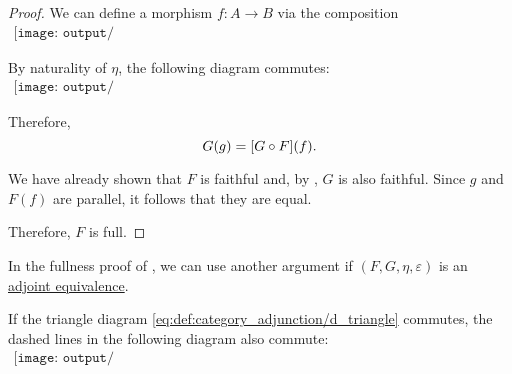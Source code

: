 \begin{proof}
  We can define a morphism \( f: A \to B \) via the composition
  \begin{equation}\label{eq:thm:equivalence_induces_fully_faithful_and_essentially_surjective_functor/fullness/def}
    \begin{aligned}
      \texttt{[image: output/thm\_\_equivalence\_induces\_fully\_faithful\_and\_essentially\_surjective\_functor.pdf]}
    \end{aligned}
  \end{equation}

  By naturality of \( \eta \), the following diagram commutes:
  \begin{equation}\label{eq:thm:equivalence_induces_fully_faithful_and_essentially_surjective_functor/fullness/eta_nat}
    \begin{aligned}
      \texttt{[image: output/thm\_\_equivalence\_induces\_fully\_faithful\_and\_essentially\_surjective\_functor.pdf]}
    \end{aligned}
  \end{equation}

  Therefore,
  \begin{equation*}
     G(g) = [G \bincirc F](f).
  \end{equation*}

  We have already shown that \( F \) is faithful and, by , \( G \) is also faithful. Since \( g \) and \( F(f) \) are parallel, it follows that they are equal.

  Therefore, \( F \) is full.
\end{proof}

\begin{remark}\label{rem:adjoint_equivalence_induces_fully_faithful_and_essentially_surjective_functor}
  In the fullness proof of , we can use another argument if \( (F, G, \eta, \varepsilon) \) is an \hyperref[def:adjoint_equivalence]{adjoint equivalence}.

  If the triangle diagram \eqref{eq:def:category_adjunction/d_triangle} commutes, the dashed lines in the following diagram also commute:
  \begin{equation}\label{eq:thm:equivalence_induces_fully_faithful_and_essentially_surjective_functor/fullness/triangles}
    \begin{aligned}
      \texttt{[image: output/rem\_\_adjoint\_equivalence\_induces\_fully\_faithful\_and\_essentially\_surjective\_functor.pdf]}
    \end{aligned}
  \end{equation}
\end{remark}

